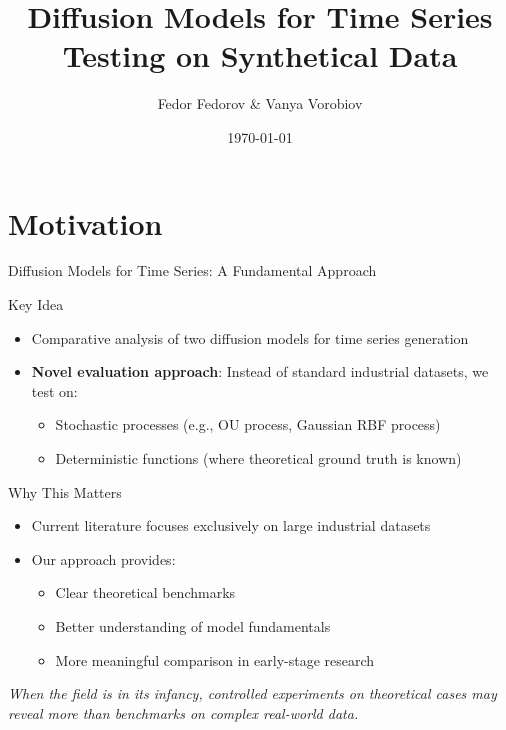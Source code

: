 \documentclass[8pt]{beamer}
\renewcommand{\|}{\ensuremath{\hspace{0.1cm} | \hspace{0.1cm}}}
\begin{document}
    \title[Diffusion Models Testing on Synthetical Data]{Diffusion Models for Time Series\\ Testing on Synthetical Data}
    \author{Fedor Fedorov \& Vanya Vorobiov}
    \date{\today}

    \begin{frame}
        \titlepage
    \end{frame}

    \section{Motivation}
    \begin{frame}{Diffusion Models for Time Series: A Fundamental Approach}
        \vspace{-0.3cm}
        \begin{block}{Key Idea}
        \begin{itemize}
            \item Comparative analysis of two diffusion models for time series generation
            \item \textbf{Novel evaluation approach}: Instead of standard industrial datasets, we test on:
            \begin{itemize}
                \item Stochastic processes (e.g., OU process, Gaussian RBF process)
                \item Deterministic functions (where theoretical ground truth is known)
            \end{itemize}
        \end{itemize}
        \end{block}
        
        \vspace{0.2cm}
        \begin{alertblock}{Why This Matters}
        \begin{itemize}
            \item Current literature focuses exclusively on large industrial datasets
            \item Our approach provides:
            \begin{itemize}
                \item Clear theoretical benchmarks
                \item Better understanding of model fundamentals
                \item More meaningful comparison in early-stage research
            \end{itemize}
        \end{itemize}
        \end{alertblock}
        
        \vspace{0.2cm}
        \footnotesize \textit{When the field is in its infancy, controlled experiments on theoretical cases may reveal more than benchmarks on complex real-world data.}
    \end{frame}
\end{document}
